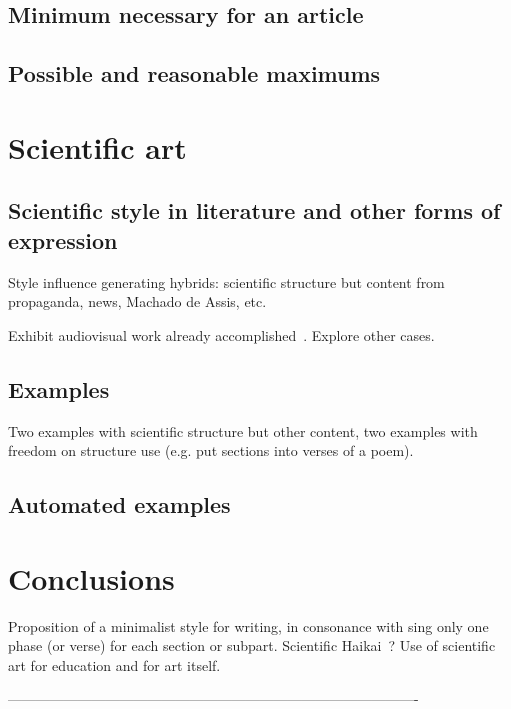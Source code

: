 \documentclass[a4paper, 11pt]{article} %
\begin{document}
\subsection*{Minimum necessary for an article}

\subsection*{Possible and reasonable maximums}

\section*{Scientific art}

\subsection*{Scientific style in literature and other forms of expression}
Style influence generating hybrids: scientific structure but content from propaganda, news, Machado de Assis, etc.

Exhibit audiovisual work already accomplished~\cite{preludio,fouHubs}. Explore other cases.

\subsection*{Examples}
Two examples with scientific structure but other content, two examples with freedom on structure use (e.g. put sections into verses of a poem).

\subsection*{Automated examples}

\section*{Conclusions}
Proposition of a minimalist style for writing, in consonance with sing only one phase (or verse) for each section or subpart. Scientific Haikai~\cite{haikai}? Use of scientific art for education and for art itself.

----------------------------------------------------------------------------------------

%



\end{document}
